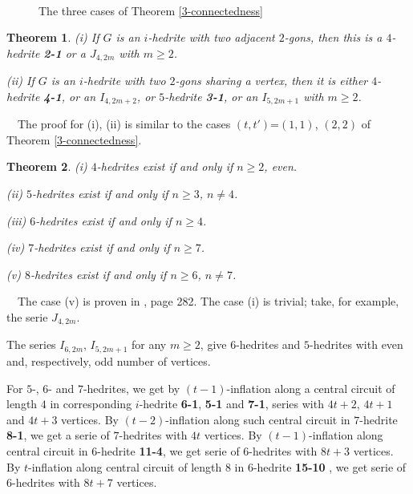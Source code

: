 \documentclass[12pt]{article}
\newtheorem{theorem}{Theorem}
\newcommand{\proof}{\noindent{\bf Proof.}\ \ }
\begin{document}
\begin{figure}
\centering
\mbox{
}
\caption{The three cases of Theorem \ref{3-connectedness}}
\label{fig:TheThreeCases}
\end{figure}



\begin{theorem}
(i) If $G$ is an $i$-hedrite with two adjacent $2$-gons, then 
this is a $4$-hedrite {\bf 2-1} or a $J_{4,2m}$ with $m\geq 2$.

(ii) If $G$ is an $i$-hedrite with two $2$-gons sharing a vertex, then 
it is either $4$-hedrite {\bf 4-1}, or an $I_{4,2m+2}$, or $5$-hedrite 
{\bf 3-1}, or an $I_{5,2m+1}$ with $m\geq 2$.

\end{theorem}

\proof The proof for (i), (ii) is similar to the cases $(t,t')$=$(1,1)$, $(2,2)$ of Theorem \ref{3-connectedness}.




\begin{theorem}

(i) $4$-hedrites exist if and only if $n\geq 2$, even.

(ii) $5$-hedrites exist if and only if $n\geq 3$, $n\not= 4$.

(iii) $6$-hedrites exist if and only if $n\geq 4$.

(iv) $7$-hedrites exist if and only if $n\geq 7$.

(v) $8$-hedrites exist if and only if $n\geq 6$, $n\not= 7$.

\end{theorem}
\proof The case (v) is proven in \cite{Gr}, page 282.
The case (i) is trivial; take, for example, the serie $J_{4,2m}$.

The series $I_{6,2m}$, $I_{5,2m+1}$ for any $m \ge 2$, give $6$-hedrites
and $5$-hedrites with even and, respectively, odd number of vertices.



For $5$-, $6$- and $7$-hedrites, we 
get by $(t-1)$-inflation
along a central circuit of length $4$ in corresponding
$i$-hedrite {\bf 6-1}, {\bf 5-1} and {\bf 7-1},
series with $4t+2$, $4t+1$ and $4t+3$ vertices. 
By $(t-2)$-inflation
along such central circuit in $7$-hedrite {\bf 8-1}, we get a serie of
$7$-hedrites with $4t$ vertices.
By $(t-1)$-inflation along central circuit in $6$-hedrite {\bf 11-4}, we
get serie of $6$-hedrites with $8t+3$ vertices.
By $t$-inflation along central circuit of length $8$ in 
$6$-hedrite {\bf 15-10 }, 
we get serie of $6$-hedrites with $8t+7$ vertices.
\end{document}
